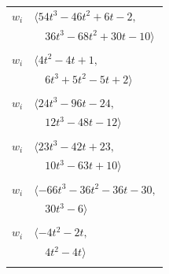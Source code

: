 \documentclass[11pt]{article}
\begin{document}
\begin{longtable}{@{}ll@{}}
$w_i$ & $\langle 54t^{3}-46t^{2}+6t-2,$\\
 & $\quad 36t^{3}-68t^{2}+30t-10\rangle$\\
\addlinespace[2pt]
\multicolumn{2}{@{}p{0.97\textwidth}@{}}{$i=21$, $D_i=1$, $\rho_{ij}$: $8{:}2, \allowbreak 10{:}1, \allowbreak 11{:}1, \allowbreak 13{:}1, \allowbreak 16{:}1, \allowbreak 35{:}1, \allowbreak 42{:}1$}\\
$w_i$ & $\langle 4t^{2}-4t+1,$\\
 & $\quad 6t^{3}+5t^{2}-5t+2\rangle$\\
\addlinespace[2pt]
\multicolumn{2}{@{}p{0.97\textwidth}@{}}{$i=22$, $D_i=18$, $\rho_{ij}$: $1{:}1, \allowbreak 5{:}1, \allowbreak 8{:}2, \allowbreak 15{:}1, \allowbreak 18{:}2, \allowbreak 20{:}1, \allowbreak 26{:}1, \allowbreak 38{:}2, \allowbreak 42{:}1$}\\
$w_i$ & $\langle 24t^{3}-96t-24,$\\
 & $\quad 12t^{3}-48t-12\rangle$\\
\addlinespace[2pt]
\multicolumn{2}{@{}p{0.97\textwidth}@{}}{$i=23$, $D_i=6$, $\rho_{ij}$: $1{:}2, \allowbreak 5{:}2, \allowbreak 9{:}1, \allowbreak 11{:}2, \allowbreak 12{:}2, \allowbreak 15{:}1, \allowbreak 28{:}1, \allowbreak 29{:}1, \allowbreak 34{:}2, \allowbreak 35{:}1$}\\
$w_i$ & $\langle 23t^{3}-42t+23,$\\
 & $\quad 10t^{3}-63t+10\rangle$\\
\addlinespace[2pt]
\multicolumn{2}{@{}p{0.97\textwidth}@{}}{$i=24$, $D_i=6$, $\rho_{ij}$: $2{:}1, \allowbreak 5{:}2, \allowbreak 13{:}1, \allowbreak 15{:}2, \allowbreak 26{:}2, \allowbreak 35{:}2, \allowbreak 37{:}1$}\\
$w_i$ & $\langle -66t^{3}-36t^{2}-36t-30,$\\
 & $\quad 30t^{3}-6\rangle$\\
\addlinespace[2pt]
\multicolumn{2}{@{}p{0.97\textwidth}@{}}{$i=25$, $D_i=2$, $\rho_{ij}$: $0{:}2, \allowbreak 7{:}1, \allowbreak 13{:}1, \allowbreak 26{:}1, \allowbreak 28{:}1, \allowbreak 41{:}1$}\\
$w_i$ & $\langle -4t^{2}-2t,$\\
 & $\quad 4t^{2}-4t\rangle$\\
\addlinespace[2pt]
\multicolumn{2}{@{}p{0.97\textwidth}@{}}{$i=26$, $D_i=36$, $\rho_{ij}$: $4{:}2, \allowbreak 7{:}1, \allowbreak 8{:}1, \allowbreak 10{:}1, \allowbreak 13{:}2, \allowbreak 22{:}2, \allowbreak 24{:}1, \allowbreak 25{:}2, \allowbreak 31{:}2, \allowbreak 32{:}1, \allowbreak 33{:}2, \allowbreak 37{:}1, \allowbreak 38{:}2$}\\

\end{longtable}
\end{document}
